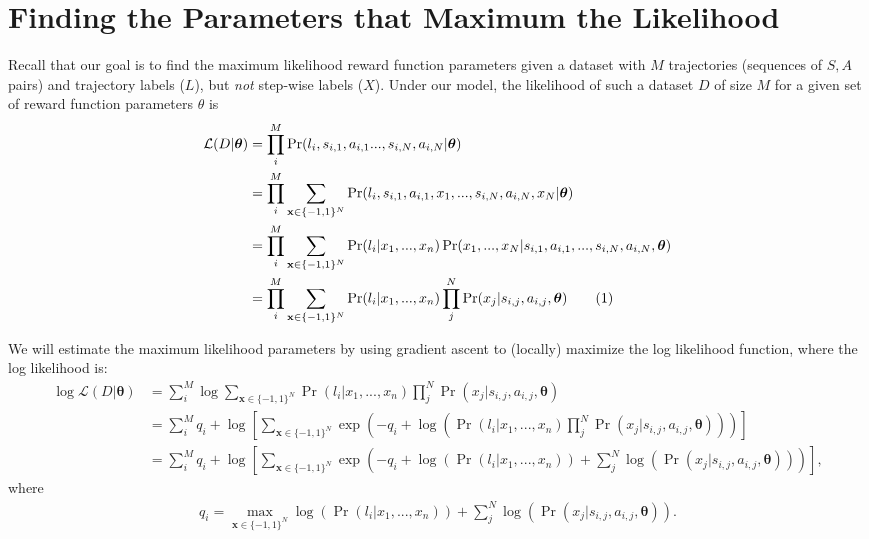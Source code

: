 \documentclass{article}
\newcommand\numberthis{\addtocounter{equation}{1}\tag{\theequation}}
\begin{document}
\section{Finding the Parameters that Maximum the Likelihood}
Recall that our goal is to find the maximum likelihood reward function parameters given a dataset with $M$ trajectories (sequences of $S,A$ pairs) and trajectory labels ($L$), but {\em not} step-wise labels ($X$). Under our model, the likelihood of such a dataset $D$ of size $M$ for a given set of reward function parameters $\theta$ is
\begin{align*}
\mathcal{L}(D | \bm{\theta}) &= \prod_i^M \Pr(l_i, s_{i,1}, a_{i,1} ..., s_{i,N}, a_{i,N}| \bm{\theta}) \\
&= \prod_i^M \sum_{\mathbf{x} \in \{-1, 1\}^N} \Pr(l_i, s_{i,1}, a_{i,1}, x_1, ..., s_{i,N}, a_{i,N}, x_N | \bm{\theta}) \\
&= \prod_i^M \sum_{\mathbf{x} \in \{-1, 1\}^N} \Pr(l_i | x_1, ..., x_n) \Pr(x_1, ..., x_N | s_{i,1}, a_{i,1}, ..., s_{i,N}, a_{i,N}, \bm{\theta}) \\
&= \prod_i^M \sum_{\mathbf{x} \in \{-1, 1\}^N} \Pr(l_i | x_1, ..., x_n) \prod_j^N \Pr(x_j | s_{i,j}, a_{i,j}, \bm{\theta}) \numberthis \label{eq:likelihood}
\end{align*}

We will estimate the maximum likelihood parameters by using gradient ascent to (locally) maximize the log likelihood function, where the log likelihood is:
\begin{align*}
\log \mathcal{L}(D | \bm{\theta}) &= \sum_i^M \log \sum_{\mathbf{x} \in \{-1, 1\}^N} \Pr(l_i | x_1, ..., x_n) \prod_j^N \Pr(x_j | s_{i,j}, a_{i,j}, \bm{\theta}) \\
&= \sum_i^M q_i + \log \left[ \sum_{\mathbf{x} \in \{-1, 1\}^N} \exp \left(-q_i + \log \left( \Pr(l_i | x_1, ..., x_n) \prod_j^N \Pr(x_j | s_{i,j}, a_{i,j}, \bm{\theta}) \right) \right) \right] \\
&= \sum_i^M q_i + \log \left[ \sum_{\mathbf{x} \in \{-1, 1\}^N} \exp \left(-q_i + \log \left( \Pr(l_i | x_1, ..., x_n) \right) + \sum_j^N \log \left( \Pr(x_j | s_{i,j}, a_{i,j}, \bm{\theta}) \right) \right) \right],
\end{align*}
where 
\begin{align*}
q_i = \max_{\mathbf{x} \in \{-1, 1\}^N} \log \left( \Pr(l_i | x_1, ..., x_n) \right) + \sum_j^N \log \left( \Pr(x_j | s_{i,j}, a_{i,j}, \bm{\theta}) \right).
\end{align*}
\end{document}
